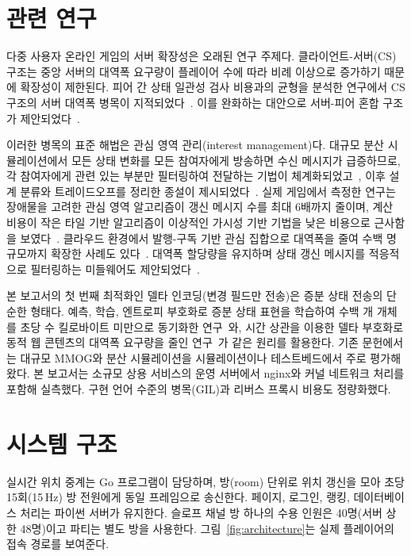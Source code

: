 \documentclass[11pt,a4paper]{article}
\begin{document}
\section{관련 연구}
다중 사용자 온라인 게임의 서버 확장성은 오래된 연구 주제다. 클라이언트-서버(CS) 구조는 중앙 서버의 대역폭 요구량이 플레이어 수에 따라 비례 이상으로 증가하기 때문에 확장성이 제한된다. 피어 간 상태 일관성 검사 비용과의 균형을 분석한 연구에서 CS 구조의 서버 대역폭 병목이 지적되었다~\cite{pellegrino_2003_12}. 이를 완화하는 대안으로 서버-피어 혼합 구조가 제안되었다~\cite{kim_2013}.

이러한 병목의 표준 해법은 관심 영역 관리(interest management)다. 대규모 분산 시뮬레이션에서 모든 상태 변화를 모든 참여자에게 방송하면 수신 메시지가 급증하므로, 각 참여자에게 관련 있는 부분만 필터링하여 전달하는 기법이 체계화되었고~\cite{morse_2000_1}, 이후 설계 분류와 트레이드오프를 정리한 종설이 제시되었다~\cite{liu_2014_2}. 실제 게임에서 측정한 연구는 장애물을 고려한 관심 영역 알고리즘이 갱신 메시지 수를 최대 6배까지 줄이며, 계산 비용이 작은 타일 기반 알고리즘이 이상적인 가시성 기반 기법을 낮은 비용으로 근사함을 보였다~\cite{boulanger_2006_10}. 클라우드 환경에서 발행-구독 기반 관심 집합으로 대역폭을 줄여 수백 명 규모까지 확장한 사례도 있다~\cite{najaran_2010_5}. 대역폭 할당량을 유지하며 상태 갱신 메시지를 적응적으로 필터링하는 미들웨어도 제안되었다~\cite{gascon_samson_2015_6}.

본 보고서의 첫 번째 최적화인 델타 인코딩(변경 필드만 전송)은 증분 상태 전송의 단순한 형태다. 예측, 학습, 엔트로피 부호화로 증분 상태 표현을 학습하여 수백 개 개체를 초당 수 킬로바이트 미만으로 동기화한 연구~\cite{orsten_2011_4}와, 시간 상관을 이용한 델타 부호화로 동적 웹 콘텐츠의 대역폭 요구량을 줄인 연구~\cite{psounis_2002_11}가 같은 원리를 활용한다. 기존 문헌에서는 대규모 MMOG와 분산 시뮬레이션을 시뮬레이션이나 테스트베드에서 주로 평가해 왔다. 본 보고서는 소규모 상용 서비스의 운영 서버에서 nginx와 커널 네트워크 처리를 포함해 실측했다. 구현 언어 수준의 병목(GIL)과 리버스 프록시 비용도 정량화했다.

\section{시스템 구조}
실시간 위치 중계는 Go 프로그램이 담당하며, 방(room) 단위로 위치 갱신을 모아 초당 15회(15\,Hz) 방 전원에게 동일 프레임으로 송신한다. 페이지, 로그인, 랭킹, 데이터베이스 처리는 파이썬 서버가 유지한다. 슬로프 채널 방 하나의 수용 인원은 40명(서버 상한 48명)이고 파티는 별도 방을 사용한다. 그림~\ref{fig:architecture}는 실제 플레이어의 접속 경로를 보여준다.
\end{document}
